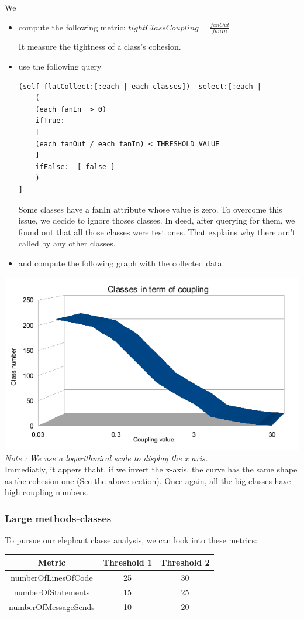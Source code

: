 \documentclass[11pt,a4paper]{article}
\begin{document}
We 
\begin{itemize}

\item compute the following metric:
$tightClassCoupling = \frac{fanOut}{fanIn}$

It measure the tightness of a class's cohesion.
\item use the following query
\begin{lstlisting}
(self flatCollect:[:each | each classes])  select:[:each | 
	(
	(each fanIn  > 0)  
	ifTrue: 
	[
	(each fanOut / each fanIn) < THRESHOLD_VALUE
	]
	ifFalse:  [ false ]
	)
]
\end{lstlisting}
Some classes have a fanIn attribute whose value is zero. To overcome this issue, we decide to ignore thoses classes. In deed, after querying for them, we found out that all those classes were test ones. That explains why there arn't called by any other classes. 

\item{and compute the following graph with the collected data.}
\end{itemize}

 
\includegraphics[width=\textwidth]{coupling_result}
\textit{Note : We use a logarithmical scale to display the x axis.}\\

Immediatly, it appers thaht, if we invert the x-axis, the curve has the same shape as the cohesion one (See the above section). Once again, all the big classes have high coupling numbers.
\subsubsection{Large methods-classes}
To pursue our elephant classe analysis, we can look into these metrics:\\
\begin{tabular}{| c | c | c |}
\hline
Metric & Threshold 1 & Threshold 2\\
\hline
numberOfLinesOfCode & 25 & 30\\
\hline
numberOfStatements & 15 & 25\\
\hline
numberOfMessageSends & 10 & 20\\
\hline
\end{tabular}\\
\end{document}
